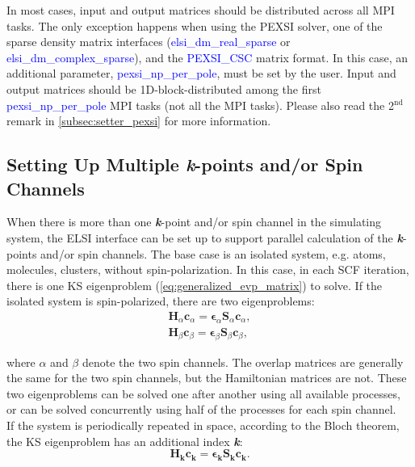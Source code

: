 \documentclass{report}
\begin{document}
\bigskip
In most cases, input and output matrices should be distributed across all MPI tasks.  The only exception happens when using the PEXSI solver, one of the sparse density matrix interfaces (\textcolor{blue}{elsi\_dm\_real\_sparse} or \textcolor{blue}{elsi\_dm\_complex\_sparse}), and the \textcolor{blue}{PEXSI\_CSC} matrix format.  In this case, an additional parameter, \textcolor{blue}{pexsi\_np\_per\_pole}, must be set by the user.  Input and output matrices should be 1D-block-distributed among the first \textcolor{blue}{pexsi\_np\_per\_pole} MPI tasks (not all the MPI tasks).  Please also read the 2$^\text{nd}$ remark in \ref{subsec:setter_pexsi} for more information.\\

\subsection{Setting Up Multiple \textbf{\textit{k}}-points and/or Spin Channels}
\label{subsec:setup_kpt}
When there is more than one \textbf{\textit{k}}-point and/or spin channel in the simulating system, the ELSI interface can be set up to support parallel calculation of the \textbf{\textit{k}}-points and/or spin channels.  The base case is an isolated system, e.g. atoms, molecules, clusters, without spin-polarization.  In this case, in each SCF iteration, there is one KS eigenproblem (\ref{eq:generalized_evp_matrix}) to solve.  If the isolated system is spin-polarized, there are two eigenproblems:\\
\begin{equation}
\label{eq:spin_evp}
\begin{split}
\boldsymbol{H}_\alpha \boldsymbol{c}_\alpha = \boldsymbol{\epsilon}_\alpha \boldsymbol{S}_\alpha \boldsymbol{c}_\alpha , \\
\boldsymbol{H}_\beta \boldsymbol{c}_\beta = \boldsymbol{\epsilon}_\beta \boldsymbol{S}_\beta \boldsymbol{c}_\beta ,
\end{split}
\end{equation}

\noindent where $\alpha$ and $\beta$ denote the two spin channels.  The overlap matrices are generally the same for the two spin channels, but the Hamiltonian matrices are not.  These two eigenproblems can be solved one after another using all available processes, or can be solved concurrently using half of the processes for each spin channel.\\

If the system is periodically repeated in space, according to the Bloch theorem, the KS eigenproblem has an additional index \textbf{\textit{k}}:\\
\begin{equation}
\label{eq:kpt_evp}
\boldsymbol{H}_{\boldsymbol{k}} \boldsymbol{c}_{\boldsymbol{k}} = \boldsymbol{\epsilon}_{\boldsymbol{k}} \boldsymbol{S}_{\boldsymbol{k}} \boldsymbol{c}_{\boldsymbol{k}} .
\end{equation}
\end{document}
